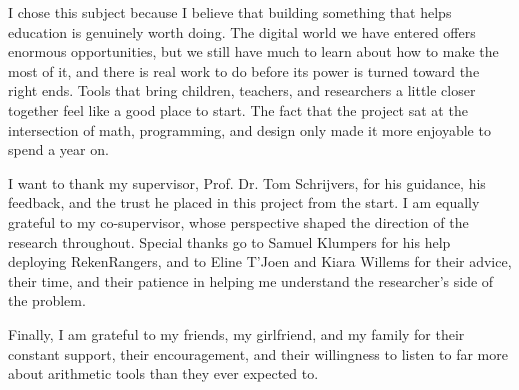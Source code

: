 \documentclass[master=ecws,english]{kulemt}
\begin{document}
\begin{preface}
I chose this subject because I believe that building something that helps education is genuinely worth doing. The digital world we have entered offers enormous opportunities, but we still have much to learn about how to make the most of it, and there is real work to do before its power is turned toward the right ends. Tools that bring children, teachers, and researchers a little closer together feel like a good place to start. The fact that the project sat at the intersection of math, programming, and design only made it more enjoyable to spend a year on.

I want to thank my supervisor, Prof. Dr. Tom Schrijvers, for his guidance, his feedback, and the trust he placed in this project from the start. I am equally grateful to my co-supervisor, whose perspective shaped the direction of the research throughout. Special thanks go to Samuel Klumpers for his help deploying RekenRangers, and to Eline T'Joen and Kiara Willems for their advice, their time, and their patience in helping me understand the researcher's side of the problem.

Finally, I am grateful to my friends, my girlfriend, and my family for their constant support, their encouragement, and their willingness to listen to far more about arithmetic tools than they ever expected to.
\end{preface}

\tableofcontents*
\end{document}
